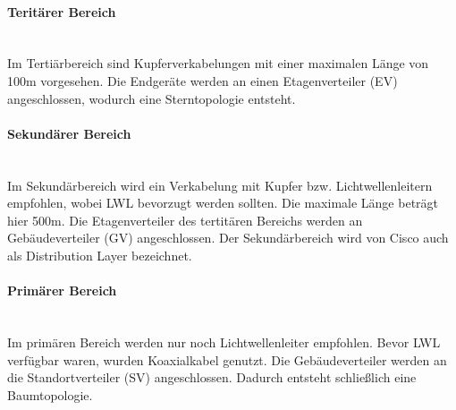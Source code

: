 \paragraph{Teritärer Bereich} ~\\

Im Tertiärbereich sind Kupferverkabelungen mit einer maximalen Länge von 100m vorgesehen. Die Endgeräte werden an einen Etagenverteiler (EV) angeschlossen, wodurch eine Sterntopologie entsteht.

\paragraph{Sekundärer Bereich} ~\\

Im Sekundärbereich wird ein Verkabelung mit Kupfer bzw. Lichtwellenleitern empfohlen, wobei LWL bevorzugt werden sollten. Die maximale Länge beträgt hier 500m. Die Etagenverteiler des tertitären Bereichs werden an Gebäudeverteiler (GV) angeschlossen. Der Sekundärbereich wird von Cisco auch als Distribution Layer bezeichnet.

\paragraph{Primärer Bereich} ~\\

Im primären Bereich werden nur noch Lichtwellenleiter empfohlen. Bevor LWL verfügbar waren, wurden Koaxialkabel genutzt. Die Gebäudeverteiler werden an die Standortverteiler (SV) angeschlossen. Dadurch entsteht schließlich eine Baumtopologie.

